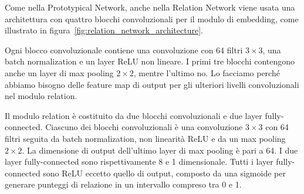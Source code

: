 \documentclass[12pt,a4paper,titlepage]{article}
\begin{document}
Come nella Prototypical Network, anche nella Relation Network viene usata una architettura con quattro blocchi convoluzionali per il modulo di embedding, come illustrato in figura~\ref{fig:relation_network_architecture}.

Ogni blocco convoluzionale contiene una convoluzione con 64 filtri $3 \times 3$, una batch normalization e un layer ReLU non lineare. I primi tre blocchi contengono anche un layer di max pooling $2 \times 2$, mentre l'ultimo no. Lo facciamo perché abbiamo bisogno delle feature map di output per gli ulteriori livelli convoluzionali nel modulo relation. 

Il modulo relation è costituito da due blocchi convoluzionali e due layer fully-connected. Ciascuno dei blocchi convoluzionali è una convoluzione $3 \times 3$ con 64 filtri seguita da batch normalization, non linearità ReLU e da un max pooling $2 \times 2$. La dimensione di output dell'ultimo layer di max pooling è pari a 64. I due layer fully-connected sono rispettivamente 8 e 1 dimensionale. Tutti i layer fully-connected sono ReLU eccetto quello di output, composto da una sigmoide per generare punteggi di relazione in un intervallo compreso tra 0 e 1.
\end{document}
